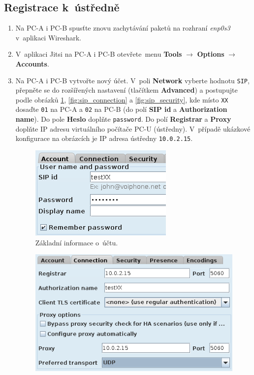 \subsection{Registrace k~ústředně}
\begin{enumerate}
    \item Na PC-A i PC-B spusťte znovu zachytávání paketů na rozhraní \emph{enp0s3} v aplikaci Wireshark.
    \item V~aplikaci Jitsi na PC-A i PC-B otevřete menu {\bf Tools} $\rightarrow$ {\bf Options} $\rightarrow$ {\bf Accounts}.
    \item Na PC-A i PC-B vytvořte nový účet. V~poli {\bf Network} vyberte hodnotu {\tt SIP}, přepněte se do rozšířených nastavení (tlačítkem {\bf Advanced}) a postupujte podle obrázků \ref{fig:sip_account}, \ref{fig:sip_connection} a \ref{fig:sip_security}, kde místo {\tt XX} dosaďte \texttt{01} na PC-A a \texttt{02} na PC-B (do polí \textbf{SIP id} a \textbf{Authorization name}).
	Do pole \textbf{Heslo} doplňte \texttt{password}. Do polí \textbf{Registrar} a \textbf{Proxy} doplňte IP adresu virtuálního počítače PC-U (ústředny). V~případě ukázkové konfigurace na obrázcích je IP adresa ústředny \texttt{10.0.2.15}.\\
\begin{figure}[H]
  \centering
  \includegraphics[scale=1]{img/sip_account.png}
  \caption{Základní informace o~účtu.}
  \label{fig:sip_account}
\end{figure}
\begin{figure}[H]
  \centering
  \includegraphics[scale=1]{img/sip_connection.png}

\end{figure}
\end{enumerate}
